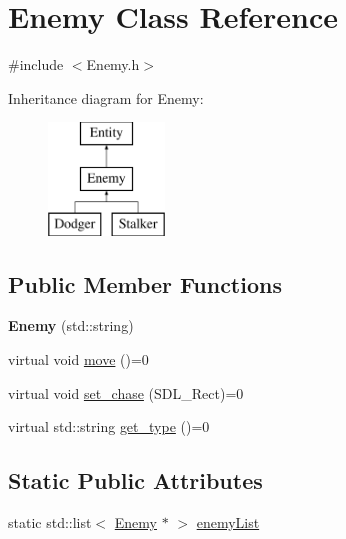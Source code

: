 \hypertarget{class_enemy}{\section{\-Enemy \-Class \-Reference}
\label{class_enemy}
}


{\ttfamily \#include $<$\-Enemy.\-h$>$}

\-Inheritance diagram for \-Enemy\-:\begin{figure}[H]
\begin{center}
\leavevmode
\includegraphics[height=3.000000cm]{class_enemy}
\end{center}
\end{figure}
\subsection*{\-Public \-Member \-Functions}
\begin{DoxyCompactItemize}
\item 
\hypertarget{class_enemy_a258ddb71f2f298663dc1ff988dcfd2e2}{{\bfseries \-Enemy} (std\-::string)}\label{class_enemy_a258ddb71f2f298663dc1ff988dcfd2e2}

\item 
virtual void \hyperlink{class_enemy_a1c208ac4a80b892f9692222bcb96f6ae}{move} ()=0
\item 
virtual void \hyperlink{class_enemy_a15bbc41c0aab860d327e1f995c9385cc}{set\-\_\-chase} (\-S\-D\-L\-\_\-\-Rect)=0
\item 
virtual std\-::string \hyperlink{class_enemy_a95a344c53db325e48c5f37bb15453f59}{get\-\_\-type} ()=0
\end{DoxyCompactItemize}
\subsection*{\-Static \-Public \-Attributes}
\begin{DoxyCompactItemize}
\item 
static std\-::list$<$ \hyperlink{class_enemy}{\-Enemy} $\ast$ $>$ \hyperlink{class_enemy_ae516249d5fea06e4c295e7e55cc8a01f}{enemy\-List}
\end{DoxyCompactItemize}



